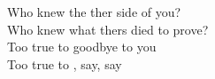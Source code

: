 \songwordfb{} Who knew the ther side of you? \\
\songwordfb{} Who knew what thers died to prove? \\
\songwordfb{} Too true to  goodbye to you \\
\songwordfb{} Too true to , say, say \\
